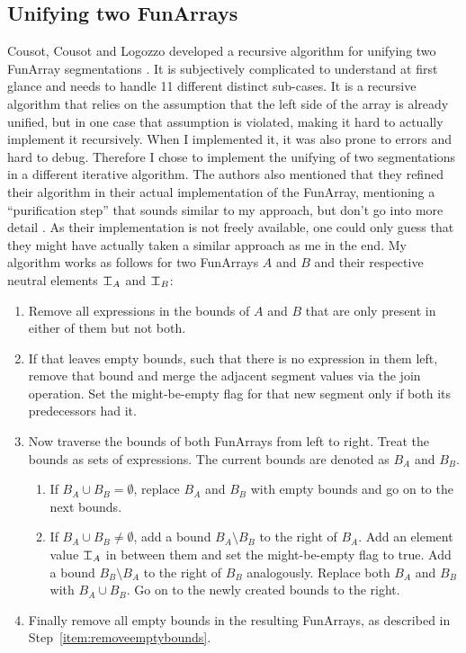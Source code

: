 \documentclass{report}
\newcommand\nElement{\mathrlap{\perp}\top}
\begin{document}
\subsection{Unifying two FunArrays}\label{sec:funarray:unifying}

Cousot, Cousot and Logozzo developed a recursive algorithm for unifying two FunArray segmentations \cite{cousot2011}. It is subjectively complicated to understand at first glance and needs to handle 11 different distinct sub-cases. It is a recursive algorithm that relies on the assumption that the left side of the array is already unified, but in one case that assumption is violated, making it hard to actually implement it recursively. When I implemented it, it was also prone to errors and hard to debug. Therefore I chose to implement the unifying of two segmentations in a different iterative algorithm. The authors also mentioned that they refined their algorithm in their actual implementation of the FunArray, mentioning a ``purification step'' that sounds similar to my approach, but don't go into more detail \cite[section 12.2]{cousot2011}. As their implementation is not freely available, one could only guess that they might have actually taken a similar approach as me in the end. My algorithm works as follows for two FunArrays $A$ and $B$ and their respective neutral elements $\nElement_A$ and $\nElement_B$:
\begin{enumerate}
  \item  Remove all expressions in the bounds of $A$ and $B$ that are only present in either of them but not both.
  \item \label{item:removeemptybounds} If that leaves empty bounds, such that there is no expression in them left, remove that bound and merge the adjacent segment values via the join operation. Set the might-be-empty flag for that new segment only if both its predecessors had it.
  \item Now traverse the bounds of both FunArrays from left to right. Treat the bounds as sets of expressions. The current bounds are denoted as $B_A$ and $B_B$.
  \begin{enumerate}[label*=\arabic*.]
    \item If $B_A \cup B_B = \emptyset$, replace $B_A$ and $B_B$ with empty bounds and go on to the next bounds.
    \item If $B_A \cup B_B \neq \emptyset$, add a bound $B_A \setminus B_B$ to the right of $B_A$. Add an element value $\nElement_A$ in between them and set the might-be-empty flag to true. Add a bound $B_B \setminus B_A$ to the right of $B_B$ analogously. Replace both $B_A$ and $B_B$ with $B_A \cup B_B$. Go on to the newly created bounds to the right.
  \end{enumerate}
  \item Finally remove all empty bounds in the resulting FunArrays, as described in Step~\ref{item:removeemptybounds}.
\end{enumerate}
\end{document}
